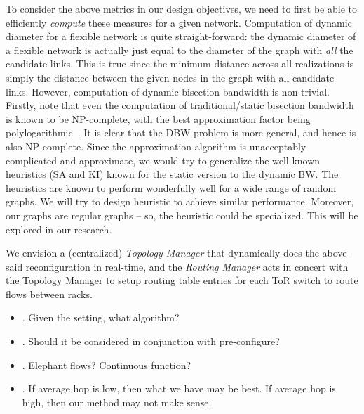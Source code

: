 To consider the above metrics in our design objectives, we need to first
be able to efficiently {\em compute} these measures for a given network.
%
Computation of dynamic diameter for a flexible network is quite
straight-forward: the dynamic diameter of a flexible network is actually
just equal to the diameter of the graph with {\em all} the candidate links. 
This is true since the minimum distance across all realizations is simply
the distance between the given nodes in the graph with all candidate links.
%
However, computation of dynamic bisection bandwidth is non-trivial.
Firstly, note that even the computation of traditional/static
bisection bandwidth is known to be NP-complete, with the best
approximation factor being polylogarithmic~\cite{}. It is clear that
the DBW problem is more general, and hence is also NP-complete. Since
the approximation algorithm is unacceptably complicated and
approximate, we would try to generalize the well-known heuristics (SA
and KI) known for the static version to the dynamic BW. The heuristics
are known to perform wonderfully well for a wide range of random
graphs.  We will try to design heuristic to achieve similar
performance.  Moreover, our graphs are regular graphs -- so, the
heuristic could be specialized.  This will be explored in our
research.




We envision a (centralized) {\em Topology Manager} that dynamically
does the above-said reconfiguration in real-time, and the {\em Routing
Manager} acts in concert with the Topology Manager to setup routing
table entries for each ToR switch to route flows between racks.


\begin{itemize}
\item
. Given the setting, what algorithm?
\item
. Should it be considered in conjunction with pre-configure?
\item
. Elephant flows? Continuous function? 
\item
. If average hop is low, then what we have may be best. If average hop is high, then our 
  method may not make sense. 
\end{itemize}




